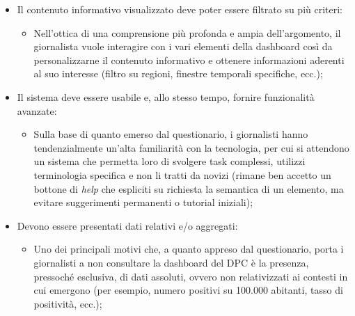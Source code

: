 \begin{itemize}
\begin{itemize}
    \end{itemize}
	\item Il contenuto informativo visualizzato deve poter essere filtrato su più criteri:
	\begin{itemize}
        \item Nell'ottica di una comprensione più profonda e ampia dell'argomento, il giornalista vuole interagire con i vari elementi della dashboard così da personalizzarne il contenuto informativo e ottenere informazioni aderenti al suo interesse (filtro su regioni, finestre temporali specifiche, ecc.);
    \end{itemize}
	\item Il sistema deve essere usabile e, allo stesso tempo, fornire funzionalità avanzate:
	\begin{itemize}
        \item Sulla base di quanto emerso dal questionario, i giornalisti hanno tendenzialmente un'alta familiarità con la tecnologia, per cui si attendono un sistema che permetta loro di svolgere task complessi, utilizzi terminologia specifica e non li tratti da novizi (rimane ben accetto un bottone di \textit{help} che espliciti su richiesta la semantica di un elemento, ma evitare suggerimenti permanenti o tutorial iniziali);
    \end{itemize}
	\item Devono essere presentati dati relativi e/o aggregati:
	\begin{itemize}
        \item Uno dei principali motivi che, a quanto appreso dal questionario, porta i giornalisti a non consultare la dashboard del DPC è la presenza, pressoché esclusiva, di dati assoluti, ovvero non relativizzati ai contesti in cui emergono (per esempio, numero positivi su 100.000 abitanti, tasso di positività, ecc.);
    \end{itemize}
\end{itemize}
